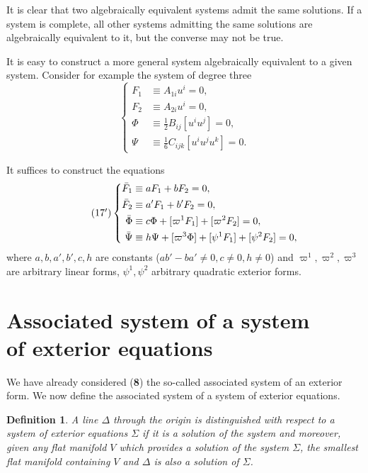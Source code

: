\documentclass[leqno,11pt]{book}
\numberwithin{equation}{chapter}
\theoremstyle{shape1}
\newtheorem*{dfn*}{\hspace{15pt}Definition}
\theoremstyle{shape0}
\theoremstyle{shape2}
\theoremstyle{definition}
\begin{document}
It is clear that two algebraically equivalent systems admit the same solutions. If a system is complete, all other systems admitting the same solutions are algebraically equivalent to it, but the converse may not be true.

It is easy to construct a more general system algebraically equivalent to a given system. Consider for example the system of degree three
\begin{equation}
  \label{eq:17}
  \left\{
    \begin{aligned}
      F_{1}&\equiv A_{1i}u^{i}=0,\\
      F_{2}&\equiv A_{2i}u^{i}=0,\\
      \Phi&\equiv \frac{1}{2}B_{ij}[u^{i}u^{j}]=0,\\
      \Psi&\equiv \frac{1}{6}C_{ijk}[u^{i}u^{j}u^{k}]=0.
    \end{aligned}
  \right.
\end{equation}

It suffices to construct the equations
\begin{equation}
  \label{eq:17'}
  \tag{17$^{\prime}$}
  \left\{
    \begin{aligned}
      \bar{F}_{1}&\equiv aF_{1}+b F_{2}=0,\\
      \bar{F}_{2}&\equiv a'F_{1}+b'F_{2}=0,\\
      \bar\Phi&\equiv c\Phi+[\varpi^{1}F_{1}]+[\varpi^{2}F_{2}]=0,\\
      \bar\Psi&\equiv h\Psi+[\varpi^{3}\Phi]+[\psi^{1}F_{1}]+[\psi^{2}F_{2}]=0,\\
    \end{aligned}
  \right.
\end{equation}
where $a,b,a',b',c,h$ are constants ($ab'-ba'\neq 0,c\neq 0,h\neq 0$) and $\varpi^{1},\varpi^{2},\varpi^{3}$ are arbitrary linear forms, $\psi^{1},\psi^{2}$ arbitrary quadratic exterior forms.
\section[Associated system of a system of exterior equations]{Associated system of a system\\of exterior equations}
\label{sec:assoc-syst-syst}

\fsec We have already considered (\textsection\textbf{8})  the so-called associated system of an exterior form. We now define the associated system of a system of exterior equations. 

\begin{dfn*}
  A line $\Delta$ through the origin is  distinguished with respect to a system of exterior equations $\Sigma$ if it is a solution of the system and moreover, given any flat manifold $V$ which provides a solution of the system $\Sigma$, the smallest flat manifold containing $V$ and $\Delta$ is also a solution of $\Sigma$.
\end{dfn*}
\end{document}
